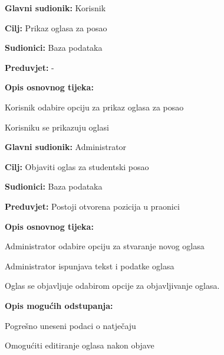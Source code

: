 \noindent {}
\begin{packed_item}
	
	\item \textbf{Glavni sudionik:} Korisnik
	\item  \textbf{Cilj:} Prikaz oglasa za posao
	\item  \textbf{Sudionici:} Baza podataka
	\item  \textbf{Preduvjet:} -
	\item  \textbf{Opis osnovnog tijeka:}
	
	\item[] \begin{packed_enum}
		
		\item Korisnik odabire opciju za prikaz oglasa za posao
		\item Korisniku se prikazuju oglasi
		
	\end{packed_enum}
	
\end{packed_item}

\noindent {}
\begin{packed_item}
	
	\item \textbf{Glavni sudionik: } Administrator
	\item  \textbf{Cilj:} Objaviti oglas za studentski posao
	\item  \textbf{Sudionici:} Baza podataka
	\item  \textbf{Preduvjet:} Postoji otvorena pozicija u praonici
	\item  \textbf{Opis osnovnog tijeka:}
	
	\item[] \begin{packed_enum}
		
		\item Administrator odabire opciju za stvaranje novog oglasa
		\item Administrator ispunjava tekst i podatke oglasa
		\item Oglas se objavljuje odabirom opcije za objavljivanje oglasa.
	\end{packed_enum}
	
	\item  \textbf{Opis mogućih odstupanja:}
	
	\item[] \begin{packed_item}
		
		\item[2.a] Pogrešno uneseni podaci o natječaju
		\item[] \begin{packed_enum}
			
			\item Omogućiti editiranje oglasa nakon objave
			
		\end{packed_enum}				
	\end{packed_item}
\end{packed_item}

